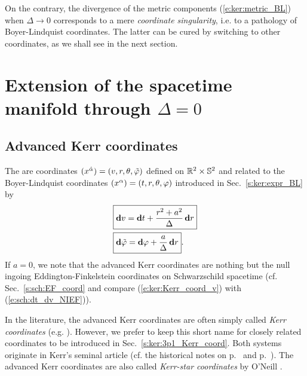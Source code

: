 On the contrary, the divergence
of the metric components (\ref{e:ker:metric_BL})
when $\Delta\rightarrow 0$ corresponds to
a mere \emph{coordinate singularity},
i.e. to a pathology of Boyer-Lindquist coordinates. The latter can be cured by switching to
other coordinates, as we shall see in the next section.


\section{Extension of the spacetime manifold through $\Delta=0$}
\label{s:ker:extension}

\subsection{Advanced Kerr coordinates} \label{s:ker:Kerr_coord}

The  are coordinates
$(x^{\hat{\alpha}}) = (v,r,\theta,{\tilde\varphi})$ defined on $\mathbb{R}^2\times\mathbb{S}^2$ and related to the Boyer-Lindquist coordinates
$(x^\alpha) = (t,r,\theta,\varphi)$ introduced in Sec.~\ref{s:ker:expr_BL} by
\begin{subequations}
\label{e:ker:Kerr_coord}
\begin{align}
& \fbox{$\displaystyle \mathbf{d} v = \mathbf{d} t + \frac{r^2+a^2}{\Delta} \, \mathbf{d} r$} \label{e:ker:Kerr_coord_v}\\
& \fbox{$\displaystyle \mathbf{d} {\tilde\varphi} = \mathbf{d} \varphi + \frac{a}{\Delta}\, \mathbf{d} r$} . \label{e:ker:Kerr_coord_tph}
\end{align}
\end{subequations}
If $a=0$, we note that the advanced Kerr coordinates are nothing but the null
ingoing Eddington-Finkelstein
coordinates on Schwarzschild spacetime (cf. Sec.~\ref{s:sch:EF_coord} and compare
(\ref{e:ker:Kerr_coord_v}) with (\ref{e:sch:dt_dv_NIEF})).

\begin{remark}
In the literature, the advanced Kerr coordinates are often simply called \emph{Kerr coordinates} (e.g. \cite{MisneTW73,Strau13}). However,
we prefer to keep this short name for closely related coordinates to be introduced in Sec.~\ref{s:ker:3p1_Kerr_coord}.
Both systems originate in Kerr's seminal article \cite{Kerr63} (cf. the historical notes on p.~\pageref{h:ker:Kerr_coord}
and p.~\pageref{h:ker:coord_ti}).
The advanced Kerr coordinates are also called \emph{Kerr-star coordinates}
by O'Neill \cite{ONeil95}.
\end{remark}


